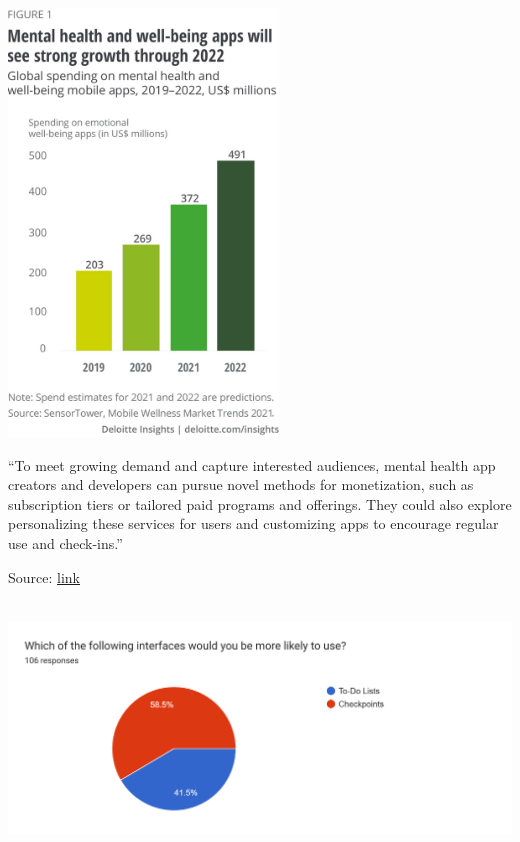 \documentclass[manuscript,screen,review]{acmart}
\begin{document}
\includegraphics[width=2.82199in,height=4.46997in]{vertopal.com_Survey analysis/vertopal_0d4ab446a1ae41f4824d7f0aaede9ca1/media/image9.jpeg}

``To meet growing demand and capture interested audiences, mental health
app creators and developers can pursue novel methods for monetization,
such as subscription tiers or tailored paid programs and offerings. They
could also explore personalizing these services for users and
customizing apps to encourage regular use and check-ins.''

Source:
\href{https://www2.deloitte.com/us/en/insights/industry/technology/technology-media-and-telecom-predictions/2022/mental-health-app-market.html}{link}

\includegraphics[width=6.26806in,height=2.63889in]{vertopal.com_Survey analysis/vertopal_0d4ab446a1ae41f4824d7f0aaede9ca1/media/image10.png}
\end{document}
